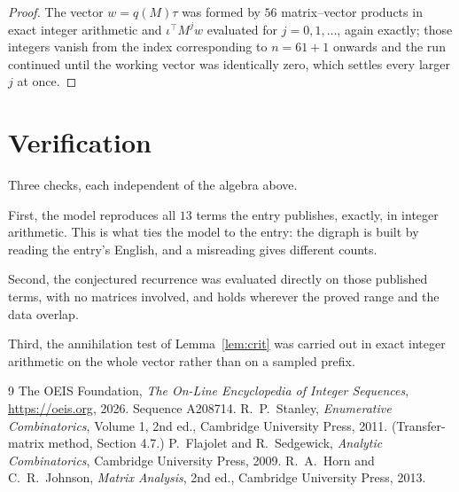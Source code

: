 \documentclass[11pt,a4paper]{article}
\theoremstyle{plain}
\theoremstyle{definition}
\begin{document}
\begin{proof}
The vector $w=q(M)\tau$ was formed by $56$ matrix--vector products in exact integer
arithmetic and $\iota^{\!\top}M^{j}w$ evaluated for $j=0,1,\dots$, again exactly; those
integers vanish from the index corresponding to $n=61+1$ onwards and the run continued
until the working vector was identically zero, which settles every larger $j$ at once.
\end{proof}

\section{Verification}

Three checks, each independent of the algebra above.

First, the model reproduces all $13$ terms the entry publishes, exactly, in integer
arithmetic. This is what ties the model to the entry: the digraph is built by reading the
entry's English, and a misreading gives different counts.

Second, the conjectured recurrence was evaluated directly on those published terms, with no
matrices involved, and holds wherever the proved range and the data overlap.

Third, the annihilation test of Lemma~\ref{lem:crit} was carried out in exact integer
arithmetic on the whole vector rather than on a sampled prefix.

\begin{thebibliography}{9}
 The OEIS Foundation, \emph{The On-Line Encyclopedia of Integer
Sequences}, \url{https://oeis.org}, 2026. Sequence A208714.
 R.~P.~Stanley, \emph{Enumerative Combinatorics}, Volume 1, 2nd ed.,
Cambridge University Press, 2011. (Transfer-matrix method, Section 4.7.)
 P.~Flajolet and R.~Sedgewick, \emph{Analytic Combinatorics}, Cambridge
University Press, 2009.
 R.~A.~Horn and C.~R.~Johnson, \emph{Matrix Analysis}, 2nd ed., Cambridge
University Press, 2013.
\end{thebibliography}
\end{document}

